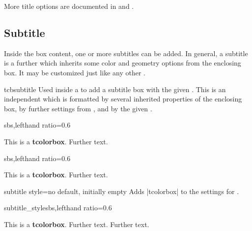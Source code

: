 \bigskip
\begin{marker}
More title options are documented in 
and .
\end{marker}

\clearpage
\subsection{Subtitle}

Inside the box content, one or more subtitles can be added.
In general, a subtitle is a further  which inherits some
color and geometry options from the enclosing box. It may be customized
just like any other .

\begin{docCommand}[doc new=2014-10-10]{tcbsubtitle}{}
  Used inside a  to add a subtitle box with the given .
  This is an independent  which is formatted by several
  inherited properties of the enclosing box, by further settings from
  , and by the given .
\begin{dispExample*}{sbs,lefthand ratio=0.6}
\begin{tcolorbox}[title=My title,
    colback=red!5!white,
    colframe=red!75!black,
    fonttitle=\bfseries]
  This is a \textbf{tcolorbox}.
  Further text.
\end{tcolorbox}
\end{dispExample*}
\begin{dispExample*}{sbs,lefthand ratio=0.6}
\begin{tcolorbox}[title=My title,
    colback=red!5!white,
    colframe=red!75!black,
    colbacktitle=yellow!50!red,
    coltitle=red!25!black,
    fonttitle=\bfseries]
  This is a \textbf{tcolorbox}.
  Further text.
\end{tcolorbox}
\end{dispExample*}
\end{docCommand}

\begin{docTcbKey}[][doc new=2014-10-10]{subtitle style}{=}{no default, initially empty}
  Adds |tcolorbox|  to the settings for .
\begin{exdispExample*}{subtitle_style}{sbs,lefthand ratio=0.6}
\begin{tcolorbox}[title=My title,
  colback=red!5!white,
  colframe=red!75!black,
  colbacktitle=yellow!50!red,
  coltitle=red!25!black,
  fonttitle=\bfseries,
  subtitle style={boxrule=0.4pt,
    colback=yellow!50!red!25!white} ]
  This is a \textbf{tcolorbox}.
  Further text.
  Further text.
\end{tcolorbox}
\end{exdispExample*}
\end{docTcbKey}


